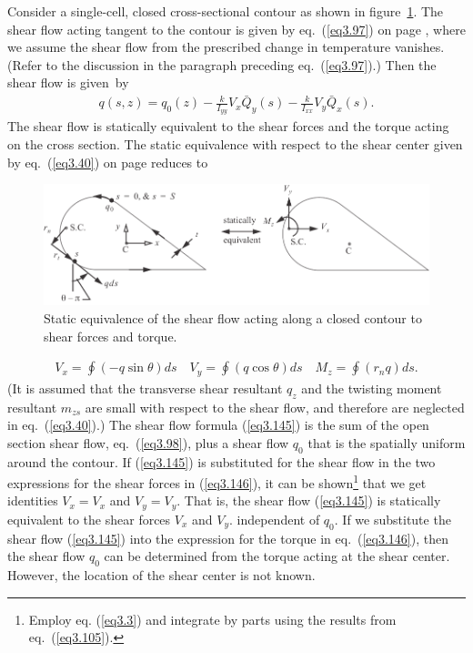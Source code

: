 \documentclass{AeroStructure-ERJohnson}
\begin{document}
Consider a single-cell, closed cross-sectional contour as shown in figure~\ref{fig3.21}. The shear flow acting tangent to the contour is given by eq.~(\ref{eq3.97}) on page \pageref{eq3.97}, where we assume the shear flow from the prescribed change in temperature vanishes. (Refer to the discussion in the paragraph preceding eq.~(\ref{eq3.97}).) Then the shear flow is given~by
\begin{align}\label{eq3.145}
q(s, z)=q_{0}(z)-\frac{k}{I_{y y}} V_{x} \bar{Q}_{y}(s)-\frac{k}{I_{x x}} V_{y} \bar{Q}_{x}(s).
\end{align}
The shear flow is statically equivalent to the shear forces and the torque acting on the cross section. The static equivalence with respect to the shear center given by eq.~(\ref{eq3.40}) on page \pageref{eq3.40} reduces to
{\def\thefigure{3.21}
\begin{figure}[!h]
\centerline{\includegraphics{Figure_3-21.pdf}}
\caption{Static equivalence of the shear flow acting along a closed contour to shear forces and torque.}\label{fig3.21}
\vspace*{-8pt}
\end{figure}}
\begin{align}\label{eq3.146}
V_{x}=\oint(-q \sin \theta) d s \quad V_{y}=\oint(q \cos \theta) d s \quad M_{z}=\oint\left(r_{n} q\right) d s.
\end{align}
(It is assumed that the transverse shear resultant $q_z$ and the twisting moment resultant $m_{zs}$ are small with respect to the shear flow, and therefore are neglected in eq.~(\ref{eq3.40}).) The shear flow formula (\ref{eq3.145}) is the sum of the open section shear flow, eq.~(\ref{eq3.98}), plus a shear flow $q_0$ that is the spatially uniform around the contour.\vadjust{\vspace*{10pt}\pagebreak} If (\ref{eq3.145}) is substituted for the shear flow in the two expressions for the shear forces in (\ref{eq3.146}), it can be shown\footnote{Employ eq. (\ref{eq3.3}) and integrate by parts using the results from eq.~(\ref{eq3.105}).} that we get identities $V_{x}=V_{x}$ and $V_{y}=V_{y}$. That is, the shear flow (\ref{eq3.145}) is statically equivalent to the shear forces $V_x$ and $V_y$. independent of $q_0$. If we substitute the shear flow (\ref{eq3.145}) into the expression for the torque in eq.~(\ref{eq3.146}), then the shear flow $q_0$ can be determined from the torque acting at the shear center. However, the location of the shear center is not known.
\end{document}
